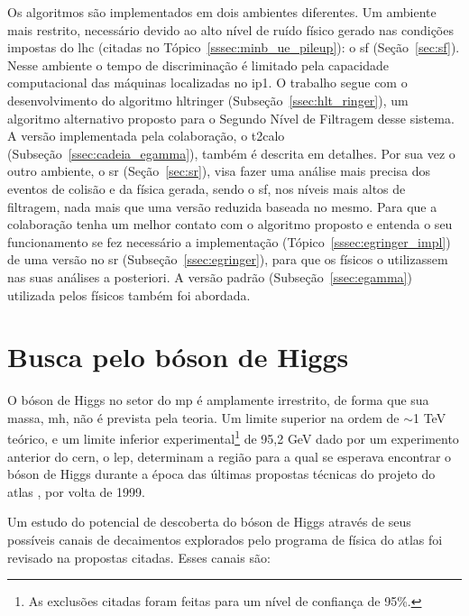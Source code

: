 Os algoritmos são implementados em dois ambientes diferentes. Um ambiente mais
restrito, necessário devido ao alto nível de ruído físico gerado nas condições 
impostas do \gls{lhc} (citadas no Tópico~\ref{sssec:minb_ue_pileup}): o
\glsdesc{sf} (Seção~\ref{sec:sf}). Nesse ambiente o tempo de discriminação 
é limitado pela capacidade computacional das máquinas localizadas 
no \gls{ip}1. O trabalho segue com o desenvolvimento do algoritmo
\acrlong{hltringer} (Subseção~\ref{ssec:hlt_ringer}), um algoritmo alternativo proposto para o
Segundo Nível de Filtragem desse sistema. A versão implementada pela
colaboração, o \gls{t2calo} (Subseção~\ref{ssec:cadeia_egamma}), 
também é descrita em detalhes. Por sua vez o outro ambiente, o \glsdesc{sr}
(Seção~\ref{sec:sr}), visa fazer uma análise mais precisa dos eventos de colisão e da 
física gerada, sendo o \glsdesc{sf}, nos níveis mais altos de filtragem, 
nada mais que uma versão reduzida baseada no mesmo. Para que a colaboração tenha 
um melhor contato com o algoritmo proposto e entenda o seu funcionamento se fez
necessário a implementação (Tópico~\ref{sssec:egringer_impl}) de uma versão no 
\glsdesc{sr} (Subseção~\ref{ssec:egringer}), para que os físicos o utilizassem nas suas 
análises a posteriori. A versão padrão (Subseção~\ref{ssec:egamma}) utilizada
pelos físicos também foi abordada.

\section{Busca pelo bóson de Higgs}
\label{sec:busca_higgs}

O bóson de Higgs no setor do \gls{mp} é amplamente irrestrito, de forma que sua
massa, \acrshort{mh}, não é prevista pela teoria. Um limite superior na ordem de
$\sim$1 TeV teórico, e um limite inferior experimental\footnote{As exclusões
citadas foram feitas para um nível de confiança de 95\%.\label{fn:95cl}} de 95,2
GeV \cite{lep_higgs_1999} dado por um experimento anterior do \gls{cern}, o \gls{lep}, 
determinam a região para a qual
se esperava encontrar o bóson de Higgs durante a época das últimas propostas técnicas
do projeto do \gls{atlas} \cite{ATLAS_TDR,ATLAS_TDR2}, por volta de 1999. 

Um estudo do potencial de descoberta do bóson de Higgs através de seus
possíveis canais de decaimentos explorados pelo programa de física do
\gls{atlas} foi revisado na propostas citadas. Esses canais são:

